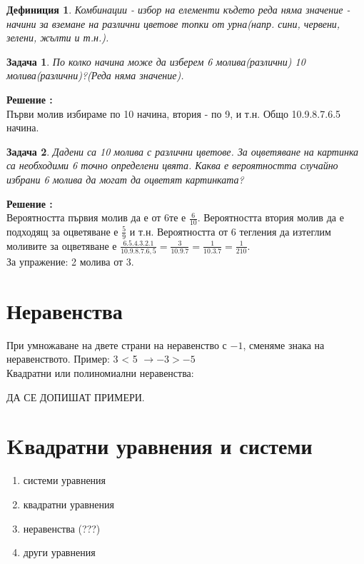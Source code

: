 \documentclass{article}
\newtheorem{definition}{Дефиниция}
\newtheorem{problem}{Задача}
\newcounter{solution}
\newcommand\solution{%
	\stepcounter{solution}%
	\textbf{Решение :}\\%
}
\begin{document}
\begin{definition}
	Комбинации - избор на елементи където реда няма значение - начини за вземане на различни цветове топки от урна(напр. сини, червени, зелени, жълти и т.н.).
\end{definition}

\begin{problem}
По колко начина може да изберем 6 молива(различни) 10 молива(различни)?(Реда няма значение).
\end{problem}
\solution Първи молив избираме по 10 начина, втория - по 9, и т.н. Общо 10.9.8.7.6.5 начина.



\begin{problem}
	Дадени са 10 молива с различни цветове. За оцветяване на картинка са необходими 6 точно определени цвята. Каква е вероятността случайно избрани 6 молива да могат да оцветят картинката?
\end{problem}
\solution
Вероятността първия молив да е от 6те е $\frac{6}{10}$. Вероятността втория молив да е подходящ за оцветяване е  $\frac{5}{9}$ и т.н. Вероятността от 6 тегления да изтеглим моливите за оцветяване е $\frac{6.5.4.3.2.1}{10.9.8.7.6,5} = \frac{3}{10.9.7} = \frac{1}{10.3.7} = \frac{1}{210}$. \\
За упражение: 2 молива от 3.




	\section{Неравенства}
	При умножаване на двете страни на неравенство с $-1$, сменяме знака на неравенството. Пример:
	 3 < 5  $ \to -3>-5 $ \\
	 
	 Квадратни или полиномиални неравенства:
	 
	 
	ДА СЕ ДОПИШАТ ПРИМЕРИ.	 

	
	\section{Kвадратни уравнения и системи}
	
		
	\begin{enumerate}
		\item системи уравнения
		\item квадратни уравнения
		\item неравенства (???)
		\item други уравнения
	\end{enumerate}
	
\end{document}
